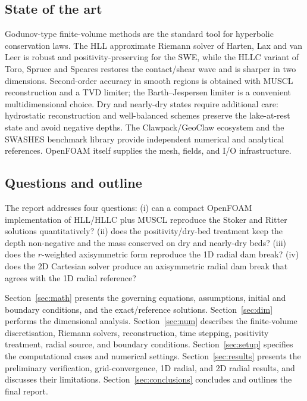 ﻿\documentclass[11pt,a4paper]{article}
\begin{document}
\subsection{State of the art}
Godunov-type finite-volume methods are the standard tool for hyperbolic
conservation laws.  The HLL approximate Riemann solver of Harten, Lax and
van Leer \cite{harten1983} is robust and positivity-preserving for the SWE,
while the HLLC variant of Toro, Spruce and Speares \cite{toro1994} restores the
contact/shear wave and is sharper in two dimensions.  Second-order accuracy in
smooth regions is obtained with MUSCL reconstruction \cite{vanleer1979} and a
TVD limiter; the Barth--Jespersen limiter \cite{barth1989} is a convenient
multidimensional choice.  Dry and nearly-dry states require additional care:
hydrostatic reconstruction and well-balanced schemes \cite{audusse2004,
kurganov2007,bollermann2013} preserve the lake-at-rest state and avoid
negative depths.  The Clawpack/GeoClaw ecosystem \cite{mandli2016} and the
SWASHES benchmark library \cite{delestre2013} provide independent numerical
and analytical references.  OpenFOAM itself \cite{weller1998,openfoam2406}
supplies the mesh, fields, and I/O infrastructure.

\subsection{Questions and outline}
The report addresses four questions:
(i) can a compact OpenFOAM implementation of HLL/HLLC plus MUSCL reproduce the
Stoker and Ritter solutions quantitatively?
(ii) does the positivity/dry-bed treatment keep the depth non-negative and the
mass conserved on dry and nearly-dry beds?
(iii) does the $r$-weighted axisymmetric form reproduce the 1D radial dam break?
(iv) does the 2D Cartesian solver produce an axisymmetric radial dam break that
agrees with the 1D radial reference?

Section~\ref{sec:math} presents the governing equations, assumptions, initial
and boundary conditions, and the exact/reference solutions.  Section~\ref{sec:dim}
performs the dimensional analysis.  Section~\ref{sec:num} describes the
finite-volume discretisation, Riemann solvers, reconstruction, time stepping,
positivity treatment, radial source, and boundary conditions.
Section~\ref{sec:setup} specifies the computational cases and numerical
settings.  Section~\ref{sec:results} presents the preliminary verification,
grid-convergence, 1D radial, and 2D radial results, and discusses their
limitations.  Section~\ref{sec:conclusions} concludes and outlines the final
report.
\end{document}
